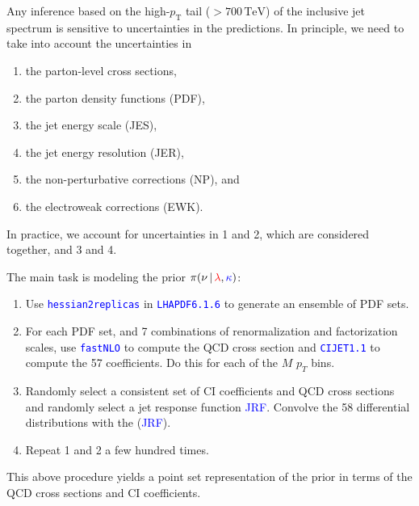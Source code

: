 \documentclass[t,professionalfonts,handout, xcolor=pdftex,dvipsnames,table]{beamer}
\newcommand{\rlambda}{\textcolor{red}{\lambda}}
\newcommand{\bkappa}{\textcolor{blue}{\kappa}}
\begin{document}
\begin{frame}
Any inference based on the high-$p_\textrm{T}$ tail ($> 700\,\textrm{TeV}$) of the inclusive
jet spectrum is sensitive to uncertainties in the predictions. 
In principle, 
we need to take into account the uncertainties in
\begin{enumerate}
\item the parton-level cross sections, 
\item the parton density functions (PDF),
\item the jet energy scale (JES),
\item the jet energy resolution (JER),
\item the non-perturbative corrections (NP), and
\item the electroweak corrections (EWK).
\end{enumerate}
In practice, we account for uncertainties in 1 and 2, which are considered together, and 3 and 4.
\end{frame}


\begin{frame}
The main task is modeling the prior $ \pi(\nu  \, | \,  \rlambda, \bkappa) $:
\begin{enumerate}
\item Use \textcolor{blue}{\tt hessian2replicas} in \textcolor{blue}{\tt LHAPDF6.1.6} to generate an ensemble of PDF sets.
\item For each PDF set, and 7 combinations of renormalization and factorization scales, use 
\textcolor{blue}{\tt fastNLO} to compute the QCD cross section and
 \textcolor{blue}{\tt CIJET1.1} to compute the 57 
coefficients. Do this for  each of the $M$ $p_{T}$ bins. 
\item Randomly select a consistent set of  CI coefficients and QCD cross sections and  randomly select 
a jet response function \textcolor{blue}{JRF}. Convolve the 58 differential distributions with the (\textcolor{blue}{JRF}). 
\item Repeat 1 and 2 a few hundred times.
\end{enumerate}
This above procedure yields 
a point set representation of  the prior in terms of the QCD cross sections and CI coefficients.
\end{frame}
\end{document}
